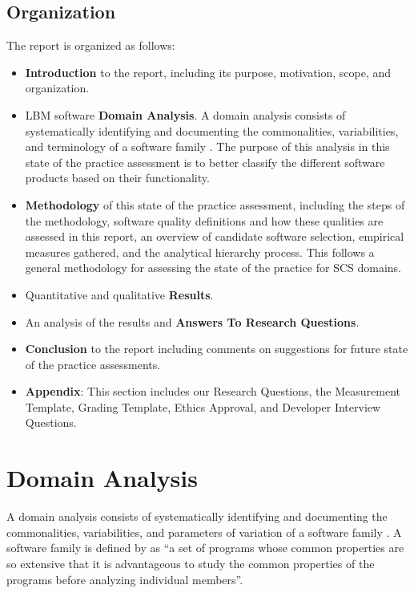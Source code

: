 \documentclass[12pt, notitlepage]{article}
\begin{document}
\subsection{Organization}

The report is organized as follows:

\begin{itemize}
	\item \textbf{Introduction} to the report, including its purpose, motivation, scope, and organization.
	\item LBM software \textbf{Domain Analysis}. A domain analysis consists of systematically identifying and documenting the commonalities, variabilities, and terminology of a software family \citep{Weiss1997}.
	The purpose of this analysis in this state of the practice assessment is to better classify the different software products based on their functionality.
	\item \textbf{Methodology} of this state of the practice assessment, including the steps of the methodology, software quality definitions and how these qualities are assessed in this report, an overview of candidate software selection, empirical measures gathered, and the analytical hierarchy process. This follows a general methodology for assessing the state of the practice for SCS domains.
	\item Quantitative and qualitative \textbf{Results}. 
	\item An analysis of the results and \textbf{Answers To Research Questions}.
	\item \textbf{Conclusion} to the report including comments on suggestions for future state of the practice assessments.
	\item \textbf{Appendix}: This section includes our Research Questions, the Measurement Template, Grading Template, Ethics Approval, and Developer Interview Questions.
\end{itemize}

\newpage

\section{Domain Analysis}\label{domainanalysis}

A domain analysis consists of systematically identifying and documenting the commonalities, variabilities, and parameters of variation of a software family \citep{Weiss1997}. A software family is defined by \cite{parnas1976design} as “a set of programs whose common properties are so extensive that it is advantageous to study the common properties of the programs before analyzing individual members”. 
\end{document}

